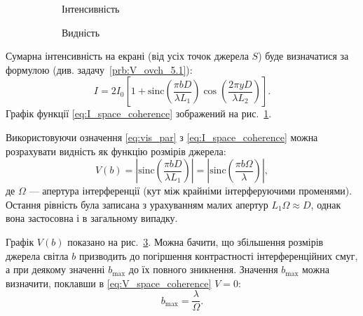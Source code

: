 \begin{figure}[h!]\centering
    \begin{subfigure}{0.49\linewidth}\centering
        
        \caption{Інтенсивність}
        \label{pic:I(y)_space_coherence}
    \end{subfigure}
    \begin{subfigure}{0.49\linewidth}\centering
        
        \caption{Видність}
        \label{pic:V(b)_space_coherence}
    \end{subfigure}
\caption{}
\end{figure}


Сумарна інтенсивність на екрані (від усіх точок джерела $ S $) буде визначатися за формулою (див. задачу~\ref{prb:V_ovch_5.1}):
\begin{equation}\label{eq:I_space_coherence}
    I = 2I_0\left[ 1 + \mathrm{sinc}\left( \frac{\pi bD}{\lambda L_1}\right) \cos\left( \frac{2\pi yD}{\lambda L_2}\right) \right].
\end{equation}
 Графік функції \eqref{eq:I_space_coherence} зображений на рис.~\ref{pic:I(y)_space_coherence}.

Використовуючи означення \eqref{eq:vis_par} з \eqref{eq:I_space_coherence} можна розрахувати видність як функцію розмірів джерела:
\begin{equation}\label{eq:V_space_coherence}
    V(b) = \left|\mathrm{sinc}\left( \frac{\pi bD}{\lambda L_1}\right) \right| = \left|\mathrm{sinc}\left( \frac{\pi b \Omega}{\lambda}\right) \right|,
\end{equation}
де $ \Omega $ --- апертура інтерференції (кут між крайніми інтерферуючими променями). Остання рівність була записана з урахуванням малих апертур $ L_1\Omega \approx D $, однак вона застосовна і в загальному випадку.

Графік $ V(b) $ показано на рис.~\ref{pic:V(b)_space_coherence}. Можна бачити, що збільшення розмірів джерела світла $ b $ призводить до погіршення контрастності інтерференційних смуг, а при деякому значенні $ b_{\max} $ до їх повного зникнення. Значення $ b_{\max} $ можна визначити, поклавши в \eqref{eq:V_space_coherence} $ V = 0 $:
\begin{equation}\label{eq:b_max}
    b_{\max} = \frac{\lambda}{\Omega}.
\end{equation}

